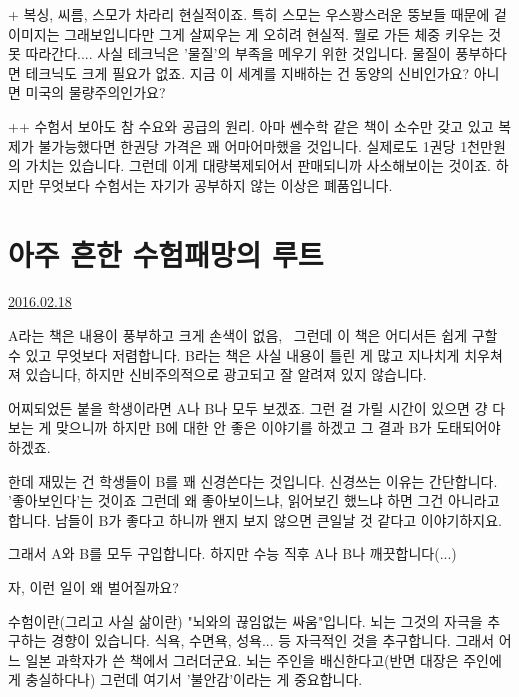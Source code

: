 +
복싱, 씨름, 스모가 차라리 현실적이죠.
특히 스모는 우스꽝스러운 뚱보들 때문에 겉이미지는 그래보입니다만
그게 살찌우는 게 오히려 현실적. 뭘로 가든 체중 키우는 것 못 따라간다....
사실 테크닉은 '물질'의 부족을 메우기 위한 것입니다. 물질이 풍부하다면 테크닉도 크게 필요가 없죠.
지금 이 세계를 지배하는 건 동양의 신비인가요? 아니면 미국의 물량주의인가요?
\vspace{5mm}

++
수험서 보아도 참 수요와 공급의 원리.
아마 쎈수학 같은 책이 소수만 갖고 있고 복제가 불가능했다면 한권당 가격은 꽤 어마어마했을 것입니다.
실제로도 1권당 1천만원의 가치는 있습니다. 그런데 이게 대량복제되어서 판매되니까 사소해보이는 것이죠.
하지만 무엇보다 수험서는 자기가 공부하지 않는 이상은 폐품입니다.
\vspace{5mm}






\section{아주 흔한 수험패망의 루트}
\href{https://www.kockoc.com/Apoc/640984}{2016.02.18}

\vspace{5mm}

A라는 책은 내용이 풍부하고 크게 손색이 없음,  그런데 이 책은 어디서든 쉽게 구할 수 있고 무엇보다 저렴합니다.
B라는 책은 사실 내용이 틀린 게 많고 지나치게 치우쳐져 있습니다, 하지만 신비주의적으로 광고되고 잘 알려져 있지 않습니다.
\vspace{5mm}

어찌되었든 붙을 학생이라면 A나 B나 모두 보겠죠. 그런 걸 가릴 시간이 있으면 걍 다 보는 게 맞으니까
하지만 B에 대한 안 좋은 이야기를 하겠고 그 결과 B가 도태되어야하겠죠.
\vspace{5mm}

한데 재밌는 건 학생들이 B를 꽤 신경쓴다는 것입니다.
신경쓰는 이유는 간단합니다. '좋아보인다'는 것이죠
그런데 왜 좋아보이느냐, 읽어보긴 했느냐 하면 그건 아니라고 합니다.
남들이 B가 좋다고 하니까 왠지 보지 않으면 큰일날 것 같다고 이야기하지요.
\vspace{5mm}

그래서 A와 B를 모두 구입합니다. 하지만 수능 직후 A나 B나 깨끗합니다(...)
\vspace{5mm}

자, 이런 일이 왜 벌어질까요?
\vspace{5mm}

수험이란(그리고 사실 삶이란) "뇌와의 끊임없는 싸움"입니다.
뇌는 그것의 자극을 추구하는 경향이 있습니다. 식욕, 수면욕, 성욕... 등 자극적인 것을 추구합니다.
그래서 어느 일본 과학자가 쓴 책에서 그러더군요. 뇌는 주인을 배신한다고(반면 대장은 주인에게 충실하다나)
그런데 여기서 '불안감'이라는 게 중요합니다.
\vspace{5mm}

